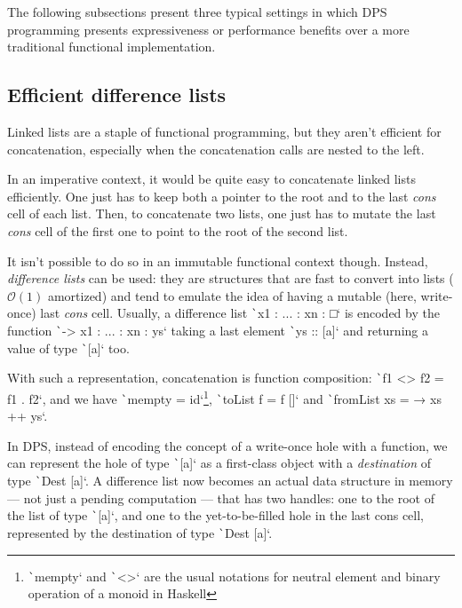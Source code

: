 \documentclass[english]{jflart}
\begin{document}
The following subsections present three typical settings in which DPS programming presents expressiveness or performance benefits over a more traditional functional implementation.

\subsection{Efficient difference lists}\label{ssec:dlist}

Linked lists are a staple of functional programming, but they aren't efficient for concatenation, especially when the concatenation calls are nested to the left.

In an imperative context, it would be quite easy to concatenate linked lists efficiently. One just has to keep both a pointer to the root and to the last \emph{cons} cell of each list. Then, to concatenate two lists, one just has to mutate the last \emph{cons} cell of the first one to point to the root of the second list.

It isn't possible to do so in an immutable functional context though. Instead, \emph{difference lists} can be used: they are structures that are fast to convert into lists ($\mathcal{O}(1)$ amortized) and tend to emulate the idea of having a mutable (here, write-once) last \emph{cons} cell. Usually, a difference list \texttt`x1 : ... : xn : □` is encoded by the function \texttt`\ys -> x1 : ... : xn : ys` taking a last element \texttt`ys :: [a]` and returning a value of type \texttt`[a]` too.

With such a representation, concatenation is function composition: \texttt`f1 <> f2 = f1 . f2`, and we have \texttt`mempty = id`\footnote{\texttt`mempty` and \texttt`<>` are the usual notations for neutral element and binary operation of a monoid in Haskell}, \texttt`toList f = f []` and \texttt`fromList xs = \ys → xs ++ ys`.

In DPS, instead of encoding the concept of a write-once hole with a function, we can represent the hole of type \texttt`[a]` as a first-class object with a \emph{destination} of type \texttt`Dest [a]`. A difference list now becomes an actual data structure in memory --- not just a pending computation --- that has two handles: one to the root of the list of type \texttt`[a]`, and one to the yet-to-be-filled hole in the last cons cell, represented by the destination of type \texttt`Dest [a]`.
\end{document}

